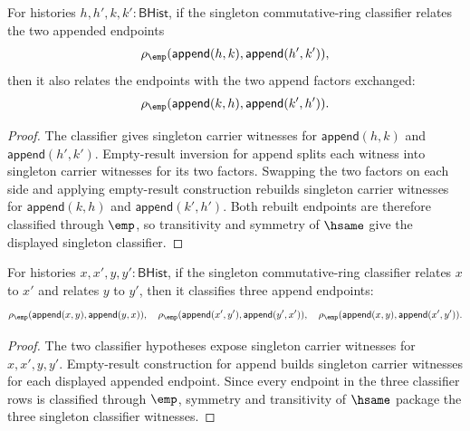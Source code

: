\begin{theorem}
\label{thm:commring-singleton-classifier-append-comm-congr}
For histories $h,h',k,k':\mathsf{BHist}$, if the singleton commutative-ring
classifier relates the two appended endpoints
$$
\rho_{\emp}(\mathsf{append}(h,k),\mathsf{append}(h',k')),
$$
then it also relates the endpoints with the two append factors exchanged:
$$
\rho_{\emp}(\mathsf{append}(k,h),\mathsf{append}(k',h')).
$$
\end{theorem}
\begin{proof}
The classifier gives singleton carrier witnesses for
$\mathsf{append}(h,k)$ and $\mathsf{append}(h',k')$. Empty-result inversion for
append splits each witness into singleton carrier witnesses for its two
factors. Swapping the two factors on each side and applying empty-result
construction rebuilds singleton carrier witnesses for
$\mathsf{append}(k,h)$ and $\mathsf{append}(k',h')$. Both rebuilt endpoints are
therefore classified through $\emp$, so transitivity and symmetry of $\hsame$
give the displayed singleton classifier.
\end{proof}

\begin{theorem}
\label{thm:commring-singleton-classifier-append-commutativity-compatible}
For histories $x,x',y,y':\mathsf{BHist}$, if the singleton commutative-ring
classifier relates $x$ to $x'$ and relates $y$ to $y'$, then it classifies
three append endpoints:
$$
\rho_{\emp}(\mathsf{append}(x,y),\mathsf{append}(y,x)),
\quad
\rho_{\emp}(\mathsf{append}(x',y'),\mathsf{append}(y',x')),
\quad
\rho_{\emp}(\mathsf{append}(x,y),\mathsf{append}(x',y')).
$$
\end{theorem}
\begin{proof}
The two classifier hypotheses expose singleton carrier witnesses for
$x,x',y,y'$. Empty-result construction for append builds singleton carrier
witnesses for each displayed appended endpoint. Since every endpoint in the
three classifier rows is classified through $\emp$, symmetry and transitivity
of $\hsame$ package the three singleton classifier witnesses.
\end{proof}


